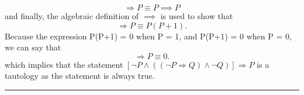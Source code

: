 \documentclass{article}
\begin{document}
\begin{equation*}
[\neg P \wedge ((\neg P \Longrightarrow Q) \wedge \neg Q)] \Longrightarrow P \equiv P\implies P
\end{equation*}
and finally, the algebraic definition of $\implies$ is used to show that
\begin{equation*}
[\neg P \wedge ((\neg P \Longrightarrow Q) \wedge \neg Q)] \Longrightarrow P \equiv P(P + 1).
\end{equation*}
Because the expression P(P+1) = 0 when P = 1, and P(P+1) = 0 when P = 0, we can say that
\begin{equation*}
[\neg P \wedge ((\neg P \Longrightarrow Q) \wedge \neg Q)] \Longrightarrow P \equiv 0.
\end{equation*}
which implies that the statement $[\neg P \wedge ((\neg P \Longrightarrow Q) \wedge \neg Q)] \Longrightarrow P$ is a tautology as the statement is always true.
\\[0.05in]\rule{\textwidth}{0.4pt}
\end{document}
